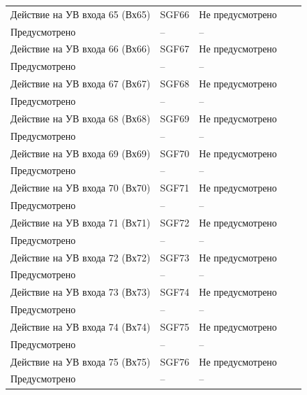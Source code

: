 \begin{longtable}{|>{\centering\arraybackslash}m{5.3cm}|>{\centering\arraybackslash}m{3.3cm}|>{\centering\arraybackslash}m{4.2cm}|>{\centering\arraybackslash}m{1.8cm}|>{\centering\arraybackslash}m{1cm}|}
\hline
\centering Действие на УВ входа 65 (Вх65)  & \centering SGF66 & \centering Не предусмотрено \\ Предусмотрено & \centering -- & \centering \arraybackslash -- \\
\hline
\centering Действие на УВ входа 66 (Вх66)  & \centering SGF67 & \centering Не предусмотрено \\ Предусмотрено & \centering -- & \centering \arraybackslash -- \\
\hline
\centering Действие на УВ входа 67 (Вх67)  & \centering SGF68 & \centering Не предусмотрено \\ Предусмотрено & \centering -- & \centering \arraybackslash -- \\
\hline
\centering Действие на УВ входа 68 (Вх68)  & \centering SGF69 & \centering Не предусмотрено \\ Предусмотрено & \centering -- & \centering \arraybackslash -- \\
\hline
\centering Действие на УВ входа 69 (Вх69)  & \centering SGF70 & \centering Не предусмотрено \\ Предусмотрено & \centering -- & \centering \arraybackslash -- \\
\hline
\centering Действие на УВ входа 70 (Вх70)  & \centering SGF71 & \centering Не предусмотрено \\ Предусмотрено & \centering -- & \centering \arraybackslash -- \\
\hline
\centering Действие на УВ входа 71 (Вх71)  & \centering SGF72 & \centering Не предусмотрено \\ Предусмотрено & \centering -- & \centering \arraybackslash -- \\
\hline
\centering Действие на УВ входа 72 (Вх72)  & \centering SGF73 & \centering Не предусмотрено \\ Предусмотрено & \centering -- & \centering \arraybackslash -- \\
\hline
\centering Действие на УВ входа 73 (Вх73)  & \centering SGF74 & \centering Не предусмотрено \\ Предусмотрено & \centering -- & \centering \arraybackslash -- \\
\hline
\centering Действие на УВ входа 74 (Вх74)  & \centering SGF75 & \centering Не предусмотрено \\ Предусмотрено & \centering -- & \centering \arraybackslash -- \\
\hline
\centering Действие на УВ входа 75 (Вх75)  & \centering SGF76 & \centering Не предусмотрено \\ Предусмотрено & \centering -- & \centering \arraybackslash -- \\

\end{longtable}
